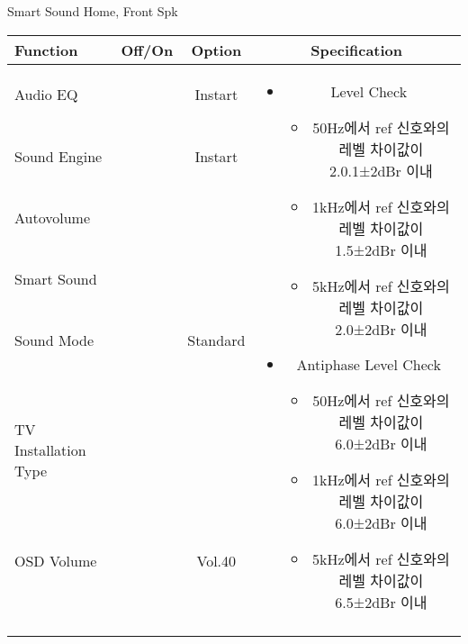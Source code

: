 \begin{frame}[t]{Smart Sound Home, Front Spk}
\begin{tiny}
\begin{tabular}{@{}lccc@{}}
\toprule
Function & Off/On & Option & Specification \\
\midrule
Audio EQ & \color{black}{Off} & Instart &
\multirow{10}{60mm}{
\begin{itemize}
	\item Level Check
	\begin{itemize}
		\item 50Hz에서 ref 신호와의 레벨 차이값이 2.0.1±2dBr 이내
		\item 1kHz에서 ref 신호와의 레벨 차이값이 1.5±2dBr 이내
		\item 5kHz에서 ref 신호와의 레벨 차이값이 2.0±2dBr 이내
	\end{itemize}
	\item Antiphase Level Check
	\begin{itemize}
		\item 50Hz에서 ref 신호와의 레벨 차이값이 6.0±2dBr 이내
		\item 1kHz에서 ref 신호와의 레벨 차이값이 6.0±2dBr 이내
		\item 5kHz에서 ref 신호와의 레벨 차이값이 6.5±2dBr 이내
	\end{itemize}
\end{itemize}
} \\
Sound Engine & \color{blue}{On} & Instart & \\
Autovolume & \color{black}{Off} & & \\
Smart Sound & \color{blue}{On} & & \\
Sound Mode & \color{blue}{On} & Standard & \\
TV Installation Type & \color{blue}{On} & \color{black}{Standtype1} & \\
OSD Volume & \color{blue}{On} & Vol.40 & \\
& & & \\
& & & \\
& & & \\
& & & \\
\midrule
\end{tabular}
\end{tiny}

\end{frame}



